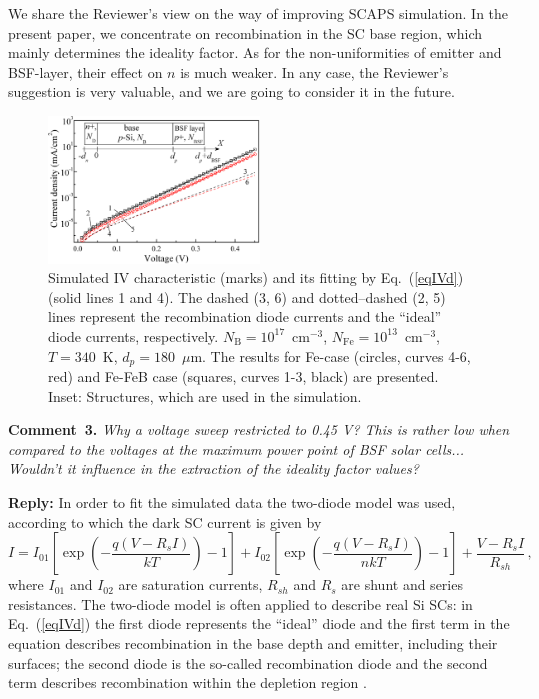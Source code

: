\documentclass[num-refs]{wiley-article} %
\begin{document}
We share the Reviewer’s view on the way of improving SCAPS simulation.
In the present paper, we concentrate on recombination in the SC base region,
which mainly determines the ideality factor.
As for the non-uniformities of emitter and  BSF-layer, their effect on $n$ is much weaker.
In any case, the Reviewer’s suggestion is very valuable, and we are going to consider it in the future.

\begin{figure}[t]
\centering
\includegraphics[width=0.5\textwidth]{FigIV}
\caption{Simulated IV characteristic (marks)
and its fitting by Eq.~(\ref{eqIVd}) (solid lines 1 and 4).
The dashed (3, 6) and dotted--dashed (2, 5)
lines represent the recombination diode currents and the ``ideal'' diode currents, respectively.
$N_\mathrm{B} = 10^{17}$~cm$^{-3}$, $N_\mathrm{Fe} = 10^{13}$~cm$^{-3}$,
$T = 340$~K, $d_p = 180$~$\mu$m.
The results for Fe-case (circles, curves 4-6, red)
and Fe-FeB case (squares, curves 1-3, black) are presented.
Inset: Structures, which are used in the simulation.
}
\label{fig_IV}
\end{figure}


\vspace{1cm}
\noindent
\textcolor[rgb]{0.00,0.50,1.00}{\textbf{Comment~3.}}
\emph{Why a voltage sweep restricted to 0.45 V?
This is rather low when compared to the voltages at the maximum power point of BSF solar cells...
Wouldn't it influence in the extraction of the ideality factor values?}

\vspace{0.5cm}
\noindent
\textcolor[rgb]{0.51,0.00,0.00}{\textbf{Reply:}}
In order to fit the simulated data the two-diode model was used,
according to which the dark SC current is given by
\begin{equation}
\label{eqIVd}
    I=I_{01}\left[\exp\left(-\frac{q(V-R_sI)}{kT}\right)-1\right]
      + I_{02}\left[\exp\left(-\frac{q(V-R_sI)}{nkT}\right)-1\right]
      +\frac{V-R_sI}{R_{sh}}\,,
\end{equation}
where
$I_{01}$ and $I_{02}$ are saturation currents,
$R_{sh}$ and $R_s$ are shunt and series resistances.
The two-diode model is often applied to describe real Si SCs:
in Eq.~(\ref{eqIVd}) the first diode represents the ``ideal'' diode
and the first term in the equation describes recombination
in the base depth and emitter, including their surfaces;
the second diode is the so-called recombination diode
and the second term describes recombination within the depletion region \citep{Breitenstein2013}.
\end{document}
